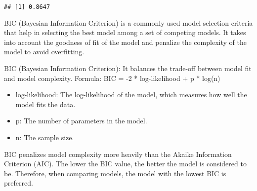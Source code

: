 \documentclass[
]{article}
\newenvironment{Shaded}{\begin{snugshade}}{\end{snugshade}}
\newcommand{\AttributeTok}[1]{\textcolor[rgb]{0.13,0.29,0.53}{#1}}
\newcommand{\CommentTok}[1]{\textcolor[rgb]{0.56,0.35,0.01}{\textit{#1}}}
\newcommand{\DecValTok}[1]{\textcolor[rgb]{0.00,0.00,0.81}{#1}}
\newcommand{\FunctionTok}[1]{\textcolor[rgb]{0.13,0.29,0.53}{\textbf{#1}}}
\newcommand{\NormalTok}[1]{#1}
\newcommand{\OtherTok}[1]{\textcolor[rgb]{0.56,0.35,0.01}{#1}}
\newcommand{\SpecialCharTok}[1]{\textcolor[rgb]{0.81,0.36,0.00}{\textbf{#1}}}
\newcommand{\StringTok}[1]{\textcolor[rgb]{0.31,0.60,0.02}{#1}}
\providecommand{\tightlist}{%
  \setlength{\itemsep}{0pt}\setlength{\parskip}{0pt}}
\begin{document}
\begin{verbatim}
## [1] 0.8647
\end{verbatim}

BIC (Bayesian Information Criterion) is a commonly used model selection
criteria that help in selecting the best model among a set of competing
models. It takes into account the goodness of fit of the model and
penalize the complexity of the model to avoid overfitting.

BIC (Bayesian Information Criterion): It balances the trade-off between
model fit and model complexity. Formula: BIC = -2 * log-likelihood + p *
log(n)

\begin{itemize}
\tightlist
\item
  log-likelihood: The log-likelihood of the model, which measures how
  well the model fits the data.
\item
  p: The number of parameters in the model.
\item
  n: The sample size.
\end{itemize}

BIC penalizes model complexity more heavily than the Akaike Information
Criterion (AIC). The lower the BIC value, the better the model is
considered to be. Therefore, when comparing models, the model with the
lowest BIC is preferred.

\begin{Shaded}
\end{Shaded}
\end{document}
